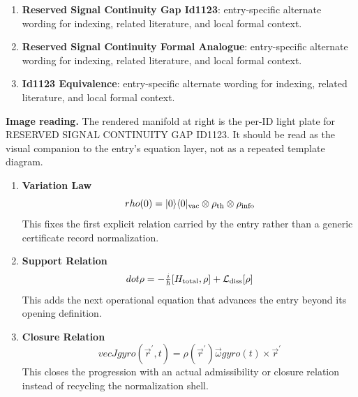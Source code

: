 \begin{enumerate}[leftmargin=1.6em,itemsep=6pt,topsep=4pt]
\item \textbf{Reserved Signal Continuity Gap Id1123}: entry-specific alternate wording for indexing, related literature, and local formal context.
\item \textbf{Reserved Signal Continuity Formal Analogue}: entry-specific alternate wording for indexing, related literature, and local formal context.
\item \textbf{Id1123 Equivalence}: entry-specific alternate wording for indexing, related literature, and local formal context.
\end{enumerate}

\begin{samepage}
\noindent\begin{minipage}[t]{0.45\linewidth}
\vspace{0pt}
\raggedright
\scriptsize\textbf{Image reading.} The rendered manifold at right is the per-ID light plate for RESERVED SIGNAL CONTINUITY GAP ID1123. It should be read as the visual companion to the entry's equation layer, not as a repeated template diagram.\par
\end{minipage}\hfill
\begin{minipage}[t]{0.53\linewidth}
\vspace*{-0.10in}
\raggedright
{}
\end{minipage}
\end{samepage}

\clearpage


\begin{enumerate}[leftmargin=1.6em,itemsep=9pt,topsep=6pt]
\item \textbf{Variation Law}
\[
rho(0)=|0\rangle\langle0|_{\rm vac}\otimes\rho_{\rm th}\otimes\rho_{\rm info}
\]
This fixes the first explicit relation carried by the entry rather than a generic certificate record normalization.

\item \textbf{Support Relation}
\[
dot\rho = -\tfrac{i}{\hbar}[H_{\rm total},\rho]+\mathcal L_{\rm diss}[\rho]
\]
This adds the next operational equation that advances the entry beyond its opening definition.

\item \textbf{Closure Relation}
\[
vec{J} {gyro}(\vec{r}^{\prime},t) = \rho(\vec{r}^{\prime})\vec{\omega} {gyro}(t)\times\vec{r}^{\prime}
\]
This closes the progression with an actual admissibility or closure relation instead of recycling the normalization shell.
\end{enumerate}

